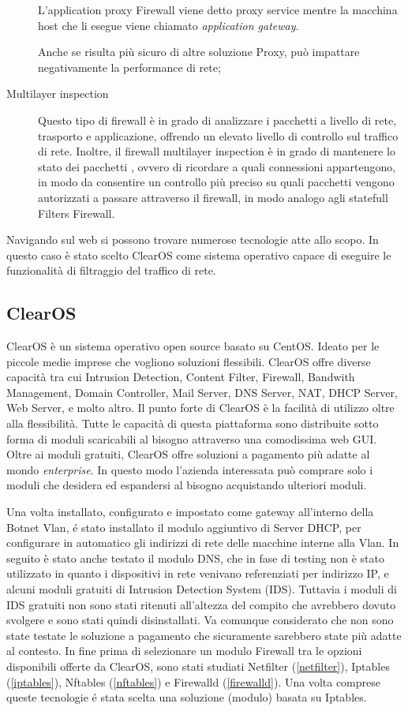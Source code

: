 \begin{description}
    L'application proxy Firewall viene detto proxy service mentre la macchina host che li esegue viene chiamato \textit{application gateway}.

    Anche se risulta più sicuro di altre soluzione Proxy, può impattare negativamente la performance di rete;
    \item[Multilayer inspection] Questo tipo di firewall è in grado di analizzare i pacchetti a livello di rete, trasporto e applicazione, offrendo un elevato livello di controllo sul traffico di rete. Inoltre, il firewall multilayer inspection è in grado di mantenere lo stato dei pacchetti , ovvero di ricordare a quali connessioni appartengono, in modo da consentire un controllo più preciso su quali pacchetti vengono autorizzati a passare attraverso il firewall, in modo analogo agli statefull Filters Firewall.


\end{description}
Navigando sul web si possono trovare numerose tecnologie atte allo scopo. In questo caso è stato scelto ClearOS come sistema operativo capace di eseguire le funzionalità di filtraggio del traffico di rete. 
\subsection{ClearOS}
\label{ClearOS}
ClearOS \cite{clearos} è un sistema operativo open source basato su CentOS. Ideato per le piccole medie imprese che vogliono soluzioni flessibili. ClearOS offre diverse capacità tra cui Intrusion Detection, Content Filter, Firewall, Bandwith Management, Domain Controller, Mail Server, DNS Server, NAT, DHCP Server, Web Server, e molto altro.
Il punto forte di ClearOS è la facilità di utilizzo oltre alla flessibilità. Tutte le capacità di questa piattaforma sono distribuite sotto forma di moduli scaricabili al bisogno attraverso una comodissima web GUI. Oltre ai moduli gratuiti, ClearOS offre soluzioni a pagamento più adatte al mondo \textit{enterprise}. In questo modo l'azienda interessata può comprare solo i moduli che desidera ed espandersi al bisogno acquistando ulteriori moduli. 

Una volta installato, configurato e impostato come gateway all'interno della Botnet Vlan, é stato installato il modulo aggiuntivo di Server DHCP, per configurare in automatico gli indirizzi di rete delle macchine interne alla Vlan.
In seguito è stato anche testato il modulo DNS, che in fase di testing non è stato utilizzato in quanto i dispositivi in rete venivano referenziati per indirizzo IP, e alcuni moduli gratuiti di Intrusion Detection System (IDS). Tuttavia i moduli di IDS gratuiti non sono stati ritenuti all'altezza del compito che avrebbero dovuto svolgere e sono stati quindi disinstallati. Va comunque considerato che non sono state testate le soluzione a pagamento che sicuramente sarebbero state più adatte al contesto. 
In fine prima di selezionare un modulo Firewall tra le opzioni disponibili offerte da  ClearOS, sono stati studiati Netfilter (\ref{netfilter}), Iptables (\ref{iptables}), Nftables (\ref{nftables}) e Firewalld (\ref{firewalld}). Una volta comprese queste tecnologie é stata scelta una soluzione (modulo) basata su Iptables.

